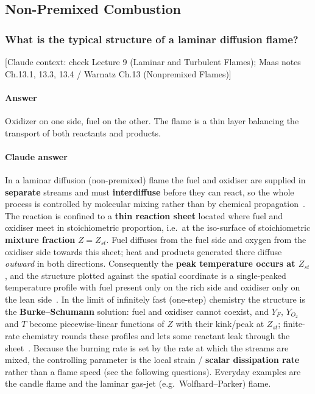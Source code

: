 \subsection{Non-Premixed Combustion}

\subsubsection{What is the typical structure of a laminar diffusion flame?}

{\color{gray}\footnotesize [Claude context: check Lecture 9 (Laminar and Turbulent Flames); Maas notes Ch.13.1, 13.3, 13.4 / Warnatz Ch.13 (Nonpremixed Flames)]}

\paragraph{Answer}
Oxidizer on one side, fuel on the other. The flame is a thin layer balancing the transport of both reactants and products.

{\color{istblue}
\paragraph{Claude answer}
In a laminar diffusion (non-premixed) flame the fuel and oxidiser are supplied in \textbf{separate} streams and must \textbf{interdiffuse} before they can react, so the whole process is controlled by molecular mixing rather than by chemical propagation~\cite{lecture9,warnatz2006combustion,glassman2014combustion}. The reaction is confined to a \textbf{thin reaction sheet} located where fuel and oxidiser meet in stoichiometric proportion, i.e.\ at the iso-surface of stoichiometric \textbf{mixture fraction} $Z=Z_{st}$. Fuel diffuses from the fuel side and oxygen from the oxidiser side towards this sheet; heat and products generated there diffuse \emph{outward} in both directions. Consequently the \textbf{peak temperature occurs at $Z_{st}$}, and the structure plotted against the spatial coordinate is a single-peaked temperature profile with fuel present only on the rich side and oxidiser only on the lean side~\cite{lecture9,poinsot2012theoretical}. In the limit of infinitely fast (one-step) chemistry the structure is the \textbf{Burke--Schumann} solution: fuel and oxidiser cannot coexist, and $Y_F$, $Y_{O_2}$ and $T$ become piecewise-linear functions of $Z$ with their kink/peak at $Z_{st}$; finite-rate chemistry rounds these profiles and lets some reactant leak through the sheet~\cite{poinsot2012theoretical,lecture9}. Because the burning rate is set by the rate at which the streams are mixed, the controlling parameter is the local strain / \textbf{scalar dissipation rate} rather than a flame speed (see the following questions). Everyday examples are the candle flame and the laminar gas-jet (e.g.\ Wolfhard--Parker) flame.
}




